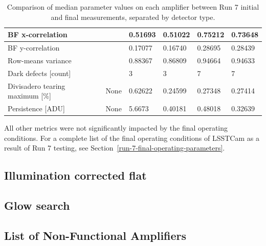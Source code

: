 \begin{table}[H]
{\begin{tabular}{|l|l|ll|ll|}
BF x-correlation                  &                                & \multicolumn{1}{l|}{0.51693}              &     0.51022        & \multicolumn{1}{l|}{0.75212}              &       0.73648      \\ \hline
BF y-correlation                  &                                & \multicolumn{1}{l|}{0.17077}              &       0.16740      & \multicolumn{1}{l|}{0.28695}              &        0.28439     \\ \hline
Row-means variance                &                                & \multicolumn{1}{l|}{0.88367}              &      0.86809       & \multicolumn{1}{l|}{0.94664}              &        0.94633     \\ \hline
Dark defects {[}count{]}          &                                & \multicolumn{1}{l|}{3}              &       3      & \multicolumn{1}{l|}{7}              &       7      \\ \hline
Divisadero tearing maximum {[}\%{]} &     None                     & \multicolumn{1}{l|}{0.62622}              &       0.24599      & \multicolumn{1}{l|}{0.27348}              &       0.27414      \\ \hline
Persistence {[}ADU{]}             &       None                         & \multicolumn{1}{l|}{5.6673}              &       0.40181      & \multicolumn{1}{l|}{0.48018}              &       0.32639      \\ \hline
\end{tabular}
}
\caption{Comparison of median parameter values on each amplifier between Run 7 initial and final measurements, separated by detector type.}
\label{table:FinalChar-paramTable}
\end{table}

All other metrics were not significantly impacted by the final operating conditions. For a complete list of the final operating conditions of LSSTCam as a result of Run 7 testing, see Section~\ref{run-7-final-operating-parameters}.

\subsection{Illumination corrected flat}


\subsection{Glow search}
\subsection{List of Non-Functional Amplifiers}\label{deadamplifiers}

